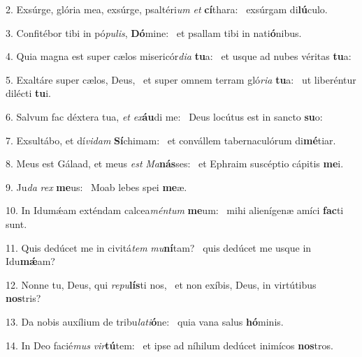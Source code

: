 2. Exsúrge, glória mea, exsúrge, psaltéri\textit{um} \textit{et} \textbf{cí}thara: \ast\  exsúrgam di\textbf{lú}culo.\

3. Confitébor tibi in pó\textit{pu}\textit{lis}, \textbf{Dó}mine: \ast\  et psallam tibi in nati\textbf{ó}nibus.\

4. Quia magna est super cælos misericór\textit{di}\textit{a} \textbf{tu}a: \ast\  et usque ad nubes véritas \textbf{tu}a:\

5. Exaltáre super cælos, Deus, \dag\  et super omnem terram gló\textit{ri}\textit{a} \textbf{tu}a: \ast\  ut liberéntur dilécti \textbf{tu}i.\

6. Salvum fac déxtera tua, \textit{et} \textit{ex}\textbf{áu}di me: \ast\  Deus locútus est in sancto \textbf{su}o:\

7. Exsultábo, et dí\textit{vi}\textit{dam} \textbf{Sí}chimam: \ast\  et convállem tabernaculórum di\textbf{mé}tiar.\

8. Meus est Gálaad, et meus \textit{est} \textit{Ma}\textbf{nás}ses: \ast\  et Ephraim suscéptio cápitis \textbf{me}i.\

9. Ju\textit{da} \textit{rex} \textbf{me}us: \ast\  Moab lebes spei \textbf{me}æ.\

10. In Idumǽam exténdam calcea\textit{mén}\textit{tum} \textbf{me}um: \ast\  mihi alienígenæ amíci \textbf{fac}ti sunt.\

11. Quis dedúcet me in civitá\textit{tem} \textit{mu}\textbf{ní}tam? \ast\  quis dedúcet me usque in Idu\textbf{mǽ}am?\

12. Nonne tu, Deus, qui \textit{re}\textit{pu}\textbf{lís}ti nos, \ast\  et non exíbis, Deus, in virtútibus \textbf{nos}tris?\

13. Da nobis auxílium de tribu\textit{la}\textit{ti}\textbf{ó}ne: \ast\  quia vana salus \textbf{hó}minis.\

14. In Deo facié\textit{mus} \textit{vir}\textbf{tú}tem: \ast\  et ipse ad níhilum dedúcet inimícos \textbf{nos}tros.\

